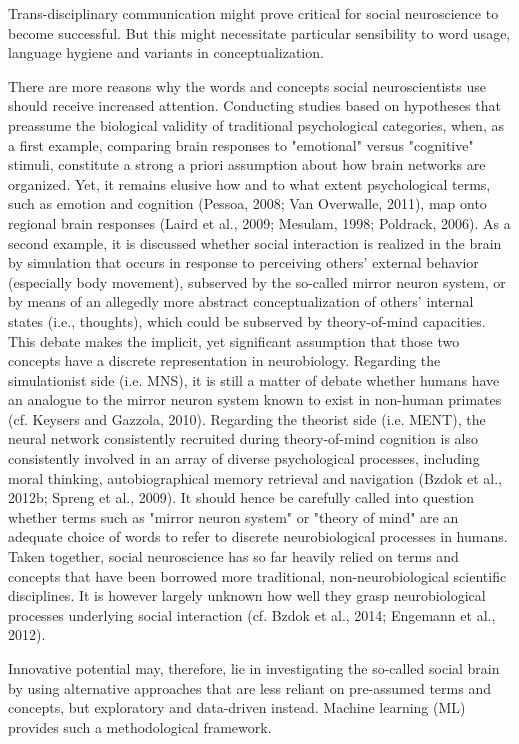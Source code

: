 \documentclass[authoryear,review,3p]{elsarticle}
\begin{document}
Trans-disciplinary communication might prove critical for social neuroscience to become successful. But this might necessitate particular sensibility to word usage, language hygiene and variants in conceptualization.

There are more reasons why the words and concepts social neuroscientists use should receive increased attention. Conducting studies based on hypotheses that preassume the biological validity of traditional psychological categories, when, as a first example, comparing brain responses to "emotional" versus "cognitive" stimuli, constitute a strong a priori assumption about how brain networks are organized. Yet, it remains elusive how and to what extent psychological terms, such as emotion and cognition (Pessoa, 2008; Van Overwalle, 2011), map onto regional brain responses (Laird et al., 2009; Mesulam, 1998; Poldrack, 2006). As a second example, it is discussed whether social interaction is realized in the brain by simulation that occurs in response to perceiving others' external behavior (especially body movement), subserved by the so-called mirror neuron system, or by means of an allegedly more abstract conceptualization of others' internal states (i.e., thoughts), which could be subserved by theory-of-mind capacities. This debate makes the implicit, yet significant assumption that those two concepts have a discrete representation in neurobiology. Regarding the simulationist side (i.e. MNS), it is still a matter of debate whether humans have an analogue to the mirror neuron system known to exist in non-human primates (cf. Keysers and Gazzola, 2010). Regarding the theorist side (i.e. MENT), the neural network consistently recruited during theory-of-mind cognition is also consistently involved in an array of diverse psychological processes, including moral thinking, autobiographical memory retrieval and navigation (Bzdok et al., 2012b; Spreng et al., 2009). It should hence be carefully called into question whether terms such as "mirror neuron system" or "theory of mind" are an adequate choice of words to refer to discrete neurobiological processes in humans. Taken together, social neuroscience has so far heavily relied on terms and concepts that have been borrowed more traditional, non-neurobiological scientific disciplines. It is however largely unknown how well they grasp neurobiological processes underlying social interaction (cf. Bzdok et al., 2014; Engemann et al., 2012).

Innovative potential may, therefore, lie in investigating the so-called social brain by using alternative approaches that are less reliant on pre-assumed terms and concepts, but exploratory and data-driven instead. Machine learning (ML) provides such a methodological framework.
\end{document}
